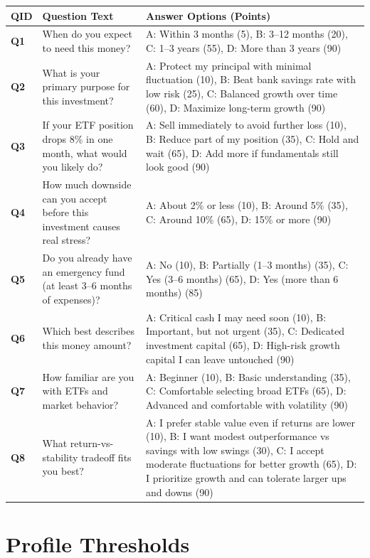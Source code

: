 \begin{longtable}{|>{\raggedright\arraybackslash\bfseries}p{1.1cm}|p{9.1cm}|p{3.2cm}|}
\hline
\rowcolor{gray!15} QID & Question Text & Answer Options (Points) \\ \hline
Q1 & When do you expect to need this money? & A: Within 3 months (5), B: 3--12 months (20), C: 1--3 years (55), D: More than 3 years (90) \\ \hline
Q2 & What is your primary purpose for this investment? & A: Protect my principal with minimal fluctuation (10), B: Beat bank savings rate with low risk (25), C: Balanced growth over time (60), D: Maximize long-term growth (90) \\ \hline
Q3 & If your ETF position drops 8\% in one month, what would you likely do? & A: Sell immediately to avoid further loss (10), B: Reduce part of my position (35), C: Hold and wait (65), D: Add more if fundamentals still look good (90) \\ \hline
Q4 & How much downside can you accept before this investment causes real stress? & A: About 2\% or less (10), B: Around 5\% (35), C: Around 10\% (65), D: 15\% or more (90) \\ \hline
Q5 & Do you already have an emergency fund (at least 3--6 months of expenses)? & A: No (10), B: Partially (1--3 months) (35), C: Yes (3--6 months) (65), D: Yes (more than 6 months) (85) \\ \hline
Q6 & Which best describes this money amount? & A: Critical cash I may need soon (10), B: Important, but not urgent (35), C: Dedicated investment capital (65), D: High-risk growth capital I can leave untouched (90) \\ \hline
Q7 & How familiar are you with ETFs and market behavior? & A: Beginner (10), B: Basic understanding (35), C: Comfortable selecting broad ETFs (65), D: Advanced and comfortable with volatility (90) \\ \hline
Q8 & What return-vs-stability tradeoff fits you best? & A: I prefer stable value even if returns are lower (10), B: I want modest outperformance vs savings with low swings (30), C: I accept moderate fluctuations for better growth (65), D: I prioritize growth and can tolerate larger ups and downs (90) \\ \hline
\end{longtable}

\section{Profile Thresholds}

